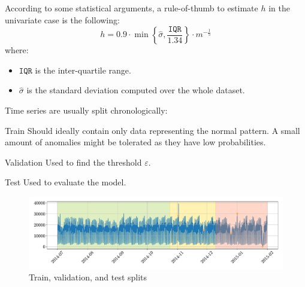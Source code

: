 \begin{description}
        \begin{remark}
            According to some statistical arguments, a rule-of-thumb to estimate $h$ in the univariate case is the following:
            \[ h = 0.9 \cdot \min\left\{ \hat{\sigma}, \frac{\texttt{IQR}}{1.34} \right\} \cdot m^{-\frac{1}{5}} \]
            where:
            \begin{itemize}
                \item $\texttt{IQR}$ is the inter-quartile range.
                \item $\hat{\sigma}$ is the standard deviation computed over the whole dataset.
            \end{itemize}
        \end{remark}

    \item[Data split] 
        Time series are usually split chronologically:
        \begin{descriptionlist}
            \item[Train] Should ideally contain only data representing the normal pattern. A small amount of anomalies might be tolerated as they have low probabilities.
            \item[Validation] Used to find the threshold $\varepsilon$.
            \item[Test] Used to evaluate the model.
        \end{descriptionlist}

        \begin{figure}[H]
            \centering
            \includegraphics[width=0.8\linewidth]{./img/_ad_taxi_splits.pdf}
            \caption{Train, validation, and test splits}
        \end{figure}


\end{description}
